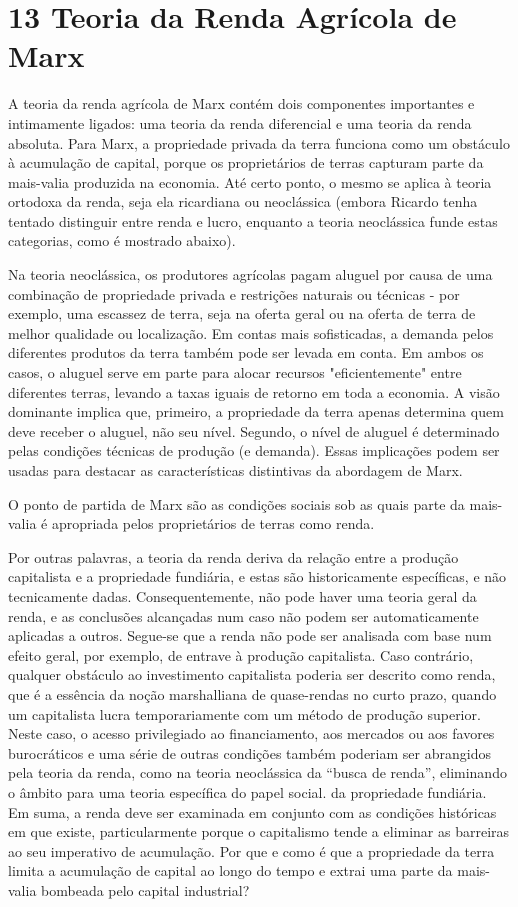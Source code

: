 \chapter{13 Teoria da Renda Agrícola de Marx}\label{13 Teoria da Renda Agrícola de Marx}
 \par 
A teoria da renda agrícola de Marx contém dois componentes importantes e intimamente ligados: uma teoria da renda diferencial e uma teoria da renda absoluta. Para Marx, a propriedade privada da terra funciona como um obstáculo à acumulação de capital, porque os proprietários de terras capturam parte da mais-valia produzida na economia. Até certo ponto, o mesmo se aplica à teoria ortodoxa da renda, seja ela ricardiana ou neoclássica (embora Ricardo tenha tentado distinguir entre renda e lucro, enquanto a teoria neoclássica funde estas categorias, como é mostrado abaixo).
 \par 
Na teoria neoclássica, os produtores agrícolas pagam aluguel por causa de uma combinação de propriedade privada e restrições naturais ou técnicas - por exemplo, uma escassez de terra, seja na oferta geral ou na oferta de terra de melhor qualidade ou localização. Em contas mais sofisticadas, a demanda pelos diferentes produtos da terra também pode ser levada em conta. Em ambos os casos, o aluguel serve em parte para alocar recursos "eficientemente" entre diferentes terras, levando a taxas iguais de retorno em toda a economia. A visão dominante implica que, primeiro, a propriedade da terra apenas determina quem deve receber o aluguel, não seu nível. Segundo, o nível de aluguel é determinado pelas condições técnicas de produção (e demanda). Essas implicações podem ser usadas para destacar as características distintivas da abordagem de Marx.
 \par 
O ponto de partida de Marx são as condições sociais sob as quais parte da mais-valia é apropriada pelos proprietários de terras como renda.
 \par 
Por outras palavras, a teoria da renda deriva da relação entre a produção capitalista e a propriedade fundiária, e estas são historicamente específicas, e não tecnicamente dadas. Consequentemente, não pode haver uma teoria geral da renda, e as conclusões alcançadas num caso não podem ser automaticamente aplicadas a outros. Segue-se que a renda não pode ser analisada com base num efeito geral, por exemplo, de entrave à produção capitalista. Caso contrário, qualquer obstáculo ao investimento capitalista poderia ser descrito como renda, que é a essência da noção marshalliana de quase-rendas no curto prazo, quando um capitalista lucra temporariamente com um método de produção superior. Neste caso, o acesso privilegiado ao financiamento, aos mercados ou aos favores burocráticos e uma série de outras condições também poderiam ser abrangidos pela teoria da renda, como na teoria neoclássica da “busca de renda”, eliminando o âmbito para uma teoria específica do papel social. da propriedade fundiária. Em suma, a renda deve ser examinada em conjunto com as condições históricas em que existe, particularmente porque o capitalismo tende a eliminar as barreiras ao seu imperativo de acumulação. Por que e como é que a propriedade da terra limita a acumulação de capital ao longo do tempo e extrai uma parte da mais-valia bombeada pelo capital industrial?
